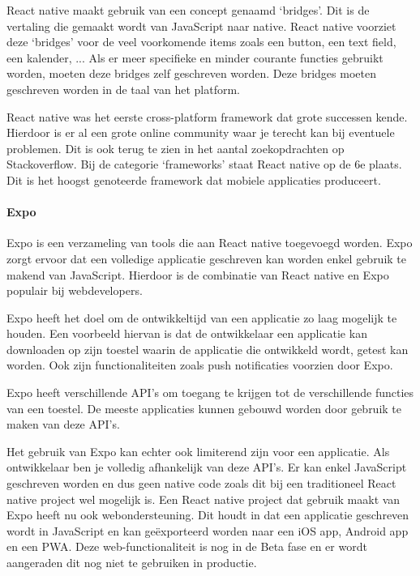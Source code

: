 		React native maakt gebruik van een concept genaamd ‘bridges’. Dit is de vertaling die gemaakt wordt van JavaScript naar native. React native voorziet deze ‘bridges’ voor de veel voorkomende items zoals een button, een text field, een kalender, ... Als er meer specifieke en minder courante functies gebruikt worden, moeten deze bridges zelf geschreven worden. Deze bridges moeten geschreven worden in de taal van het platform. 
		\autocite{Bartosz2019}
		
		React native was het eerste cross-platform framework dat grote successen kende. Hierdoor is er al een grote online community waar je terecht kan bij eventuele problemen. Dit is ook terug te zien in het aantal zoekopdrachten op Stackoverflow. Bij de categorie ‘frameworks’ staat React native op de 6e plaats. Dit is het hoogst genoteerde framework dat mobiele applicaties produceert.
		\autocite{StackOverflow2020}
		
		
		\paragraph{Expo}
			Expo is een verzameling van tools die aan React native toegevoegd worden. Expo zorgt ervoor dat een volledige applicatie geschreven kan worden enkel gebruik te makend van JavaScript. Hierdoor is de combinatie van React native en Expo populair bij webdevelopers.
			
			Expo heeft het doel om de ontwikkeltijd van een applicatie zo laag mogelijk te houden. Een voorbeeld hiervan is dat de ontwikkelaar een applicatie kan downloaden op zijn toestel waarin de applicatie die ontwikkeld wordt, getest kan worden. Ook zijn functionaliteiten zoals push notificaties voorzien door Expo.
			
			Expo heeft verschillende API's om toegang te krijgen tot de verschillende functies van een toestel. De meeste applicaties kunnen gebouwd worden door gebruik te maken van deze API's. 
			
			Het gebruik van Expo kan echter ook limiterend zijn voor een applicatie. Als ontwikkelaar ben je volledig afhankelijk van deze API's. Er kan enkel JavaScript geschreven worden en dus geen native code zoals dit bij een traditioneel React native project wel mogelijk is.
			Een React native project dat gebruik maakt van Expo heeft nu ook webondersteuning. Dit houdt in dat een applicatie geschreven wordt in JavaScript en kan geëxporteerd worden naar een iOS app, Android app en een PWA. 
			Deze web-functionaliteit is nog in de Beta fase en er wordt aangeraden dit nog niet te gebruiken in productie.
			\autocite{Expo2020}


